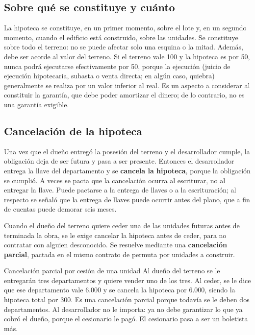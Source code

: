 \documentclass[12pt,oneside]{book}
\begin{document}
\subsection{Sobre qué se constituye y cuánto}

La hipoteca se constituye, en un primer momento, sobre el lote y, en un segundo momento, cuando el edificio está construido, sobre las unidades. Se constituye sobre todo el terreno: no se puede afectar solo una esquina o la mitad. Además, debe ser acorde al valor del terreno. Si el terreno vale 100 y la hipoteca es por 50, nunca podrá ejecutarse efectivamente por 50, porque la ejecución (juicio de ejecución hipotecaria, subasta o venta directa; en algún caso, quiebra) generalmente se realiza por un valor inferior al real. Es un aspecto a considerar al constituir la garantía, que debe poder amortizar el dinero; de lo contrario, no es una garantía exigible.

\subsection{Cancelación de la hipoteca}

Una vez que el dueño entregó la posesión del terreno y el desarrollador cumple, la obligación deja de ser futura y pasa a ser presente. Entonces el desarrollador entrega la llave del departamento y se \textbf{cancela la hipoteca}, porque la obligación se cumplió. A veces se pacta que la cancelación ocurra al escriturar, no al entregar la llave. Puede pactarse a la entrega de llaves o a la escrituración; al respecto se señaló que la entrega de llaves puede ocurrir antes del plano, que a fin de cuentas puede demorar seis meses.

Cuando el dueño del terreno quiere ceder una de las unidades futuras antes de terminada la obra, se le exige cancelar la hipoteca antes de ceder, para no contratar con alguien desconocido. Se resuelve mediante una \textbf{cancelación parcial}, pactada en el mismo contrato de permuta por unidades a construir.

\begin{example}{Cancelación parcial por cesión de una unidad}
Al dueño del terreno se le entregarán tres departamentos y quiere vender uno de los tres. Al ceder, se le dice que ese departamento vale 6.000 y se cancela la hipoteca por 6.000, siendo la hipoteca total por 300. Es una cancelación parcial porque todavía se le deben dos departamentos. Al desarrollador no le importa: ya no debe garantizar lo que ya cobró el dueño, porque el cesionario le pagó. El cesionario pasa a ser un boletista más.
\end{example}
\end{document}
